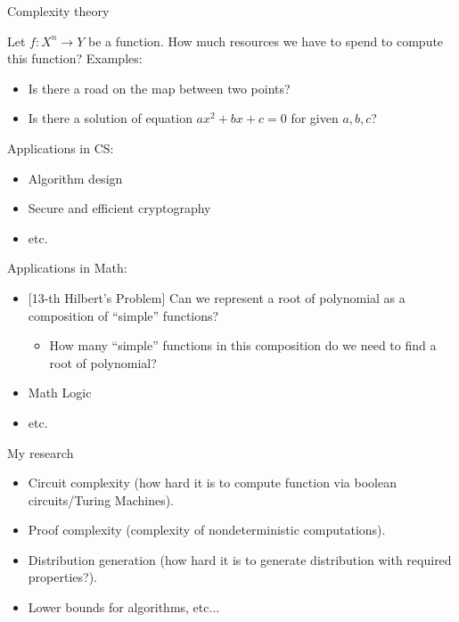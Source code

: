 \begin{frame}{Complexity theory}

    Let $f\colon X^n \to Y$ be a function. How much resources we have to spend to compute this function?
    \pause
    Examples:
    \begin{itemize}
        \item Is there a road on the map between two points?
        \item Is there a solution of equation $a x^2 + b x + c = 0$ for given $a, b, c$?
    \end{itemize}

    \pause

    Applications in CS:
    \begin{itemize}
        \item Algorithm design
        \item Secure and efficient cryptography
        \item etc.
    \end{itemize}


    \pause
    Applications in Math:
    \begin{itemize}
        \item{} [13-th Hilbert's Problem] Can we represent a root of polynomial as a composition of
            ``simple'' functions?
            \begin{itemize}
                \item How many ``simple'' functions in this composition do we need to find a root of
                    polynomial?
            \end{itemize}
        \item Math Logic
        \item etc.
    \end{itemize}
\end{frame}

\begin{frame}{My research}

    \begin{itemize}
        \item Circuit complexity (how hard it is to compute function via boolean circuits/Turing Machines).
            \pause
        \item Proof complexity (complexity of \alert{nondeterministic computations}).
            \pause
         \item Distribution generation (how hard it is to generate distribution with required
            properties?).
            \pause
        \item Lower bounds for algorithms, etc...
    \end{itemize}
\end{frame}

